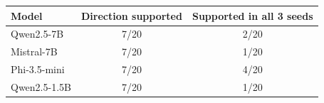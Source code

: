 \begin{tabular}{lcc}
\toprule
Model & Direction supported & Supported in all 3 seeds \\
\midrule
Qwen2.5-7B & 7/20 & 2/20 \\
Mistral-7B & 7/20 & 1/20 \\
Phi-3.5-mini & 7/20 & 4/20 \\
Qwen2.5-1.5B & 7/20 & 1/20 \\
\bottomrule
\end{tabular}
